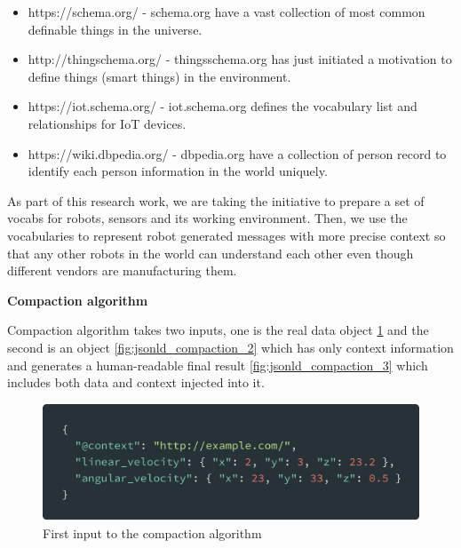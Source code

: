 	\begin{itemize}
		\item https://schema.org/ - schema.org have a vast collection of most common definable things in the universe.
		\item http://thingschema.org/ - thingsschema.org has just initiated a motivation to define things (smart things) in the environment.
		\item https://iot.schema.org/ - iot.schema.org defines the vocabulary list and relationships for IoT devices.
		\item https://wiki.dbpedia.org/ - dbpedia.org have a collection of person record to identify each person information in the world uniquely.
	\end{itemize}

	As part of this research work, we are taking the initiative to prepare a set of vocabs for robots, sensors and its working environment. Then, we use the vocabularies to represent robot generated messages with more precise context so that any other robots in the world can understand each other even though different vendors are manufacturing them.
	
	\textbf{Compaction algorithm}
	
	Compaction algorithm takes two inputs, one is the real data object \ref{fig:jsonld_compaction_1} and the second is an object \ref{fig:jsonld_compaction_2} which has only context information and generates a human-readable final result \ref{fig:jsonld_compaction_3} which includes both data and context injected into it.
	
			\begin{figure}[!htbp] 
		\begin{center}
			\includegraphics[scale=0.1]{./images/png/jsonld/compaction_1}	
			\caption{First input to the compaction algorithm}	
			\label{fig:jsonld_compaction_1}	
		\end{center}
	\end{figure}
	
